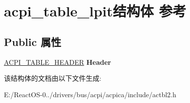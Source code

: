 \hypertarget{structacpi__table__lpit}{}\section{acpi\+\_\+table\+\_\+lpit结构体 参考}
\label{structacpi__table__lpit}
\subsection*{Public 属性}
\begin{DoxyCompactItemize}
\item 
\mbox{\label{structacpi__table__lpit_a015d9b06c391f45db17d1e608b130696}} 
\hyperlink{structacpi__table__header}{A\+C\+P\+I\+\_\+\+T\+A\+B\+L\+E\+\_\+\+H\+E\+A\+D\+ER} {\bfseries Header}
\end{DoxyCompactItemize}


该结构体的文档由以下文件生成\+:\begin{DoxyCompactItemize}
\item 
E\+:/\+React\+O\+S-\/0../drivers/bus/acpi/acpica/include/actbl2.\+h\end{DoxyCompactItemize}
